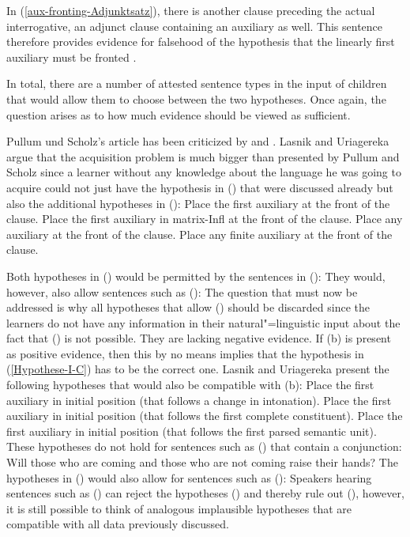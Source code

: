 In (\ref{aux-fronting-Adjunktsatz}), there is another clause preceding the actual interrogative, an adjunct clause containing an
auxiliary as well. This sentence therefore provides evidence for falsehood of the hypothesis that the linearly first auxiliary must be fronted
\citep[]{Sampson89a}. 

In total, there are a number of attested sentence types in the input of children that would allow them to choose between the two
hypotheses. Once again, the question arises as to how much evidence should be viewed as sufficient.

Pullum und Scholz's article has been criticized by \citet{LU2002a} and \citet{LY2002a}. Lasnik and Uriagereka argue that the acquisition
problem is much bigger than presented by Pullum and Scholz since a learner without any knowledge about the language he was going to acquire
could not just have the hypothesis in () that were discussed already but also the additional hypotheses in ():
\eal
\label{Hilfsverbhypothesen}
\ex Place the first auxiliary at the front of the clause.
\ex\label{Hypothese-I-C} 
Place the first auxiliary in matrix-Infl at the front of the clause.
\zl
\eal
\ex Place any auxiliary at the front of the clause.
\ex Place any finite auxiliary at the front of the clause.
\zl

Both hypotheses in () would be permitted by the sentences in ():
\eal
{}
\zl
They would, however, also allow sentences such as  ():
\z
The question that must now be addressed is why all hypotheses that allow () should be discarded since the learners do
not have any information in their natural"=linguistic input about the fact that () is not possible. They are lacking
negative evidence. If (b) is present as positive evidence, then this by no means implies
that the hypothesis in (\ref{Hypothese-I-C}) has to be the correct one. Lasnik and Uriagereka present the following hypotheses
that would also be compatible with (b):
\eal
\ex Place the first auxiliary in initial position (that follows a change in intonation).
\ex Place the first auxiliary in initial position (that follows the first complete constituent).
\ex Place the first auxiliary in initial position (that follows the first parsed semantic unit).
\zl
These hypotheses do not hold for sentences such as () that contain a conjunction:
\ea
\label{Beispiel-Hilfsverbvoranstellung-Koordination}
Will those who are coming and those who are not coming raise their hands?
\z
The hypotheses in () would also allow for sentences such as ():
\z
Speakers hearing sentences such as () can reject the hypotheses () and thereby rule out (), however, it is still possible
to think of analogous implausible hypotheses that are compatible with all data previously discussed.

